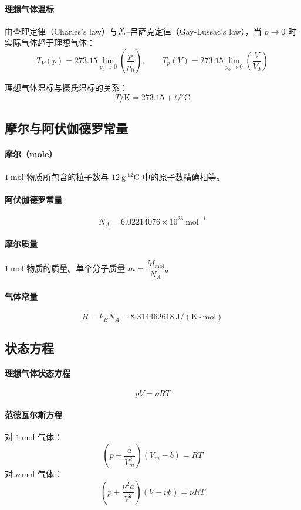 \documentclass[UTF8]{ctexart}
\begin{document}
\paragraph{理想气体温标}
由查理定律（Charles's law）与盖–吕萨克定律（Gay-Lussac's law），当 $p\to 0$ 时实际气体趋于理想气体：
\[
T_V(p)=273.15\lim_{p_0\to 0}\left(\frac{p}{p_0}\right),\qquad
T_p(V)=273.15\lim_{p_0\to 0}\left(\frac{V}{V_0}\right)
\]

理想气体温标与摄氏温标的关系：
\[
\boxed{T/\mathrm{K}=273.15+t/^{\circ}\mathrm{C}}
\]

\subsection{摩尔与阿伏伽德罗常量}

\paragraph{摩尔（mole）}
$1\ \mathrm{mol}$ 物质所包含的粒子数与 $12\ \mathrm{g}\ ^{12}\mathrm{C}$ 中的原子数精确相等。

\paragraph{阿伏伽德罗常量}
\[
N_A=6.02214076\times 10^{23}\ \mathrm{mol^{-1}}
\]

\paragraph{摩尔质量}
$1\ \mathrm{mol}$ 物质的质量。单个分子质量 $m=\dfrac{M_{\mathrm{mol}}}{N_A}$。

\paragraph{气体常量}
\[
R=k_B N_A=8.314462618\ \mathrm{J/(K\cdot mol)}
\]

\subsection{状态方程}

\paragraph{理想气体状态方程}
\[
\boxed{pV=\nu RT}
\]

\paragraph{范德瓦尔斯方程}
对 $1\ \mathrm{mol}$ 气体：
\[
\boxed{\left(p+\frac{a}{V_m^2}\right)(V_m-b)=RT}
\]
对 $\nu\ \mathrm{mol}$ 气体：
\[
\left(p+\frac{\nu^2 a}{V^2}\right)(V-\nu b)=\nu RT
\]
\end{document}
